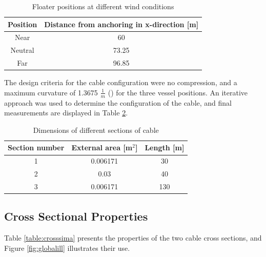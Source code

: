 \begin{table} [H]
\centering
\begin{tabular}{ |c|c|}
\hline
Position & Distance from anchoring in x-direction [m] \\
 \hline
 \hline
 
Near & 60\\

Neutral & 73.25\\

Far & 96.85 \\
 
 \hline
\end{tabular}
\caption{Floater positions at different wind conditions}
\label{table:pos}
\end{table}

The design criteria for the cable configuration were no compression, and a maximum curvature of 1.3675 $\frac{1}{m}$ (\cite{API2014}) for the three vessel positions. An iterative approach was used to determine the configuration of the cable, and final measurements are displayed in Table \ref{table:DIMCABLE}.
\begin{table} [H]
\centering
\begin{tabular}{ |c|c|c|}
\hline
Section number & External area [m$^2$] & Length [m] \\
 \hline
 \hline
1 & 0.006171 & 30\\
2 & 0.03 & 40\\
3 & 0.006171 & 130\\
 \hline
\end{tabular}
\caption{Dimensions of different sections of cable}
\label{table:DIMCABLE}
\end{table}

\subsection{Cross Sectional Properties}
 Table \ref{table:crosssima} presents the properties of the two cable cross sections, and Figure \ref{fig:globalill} illustrates their use.

